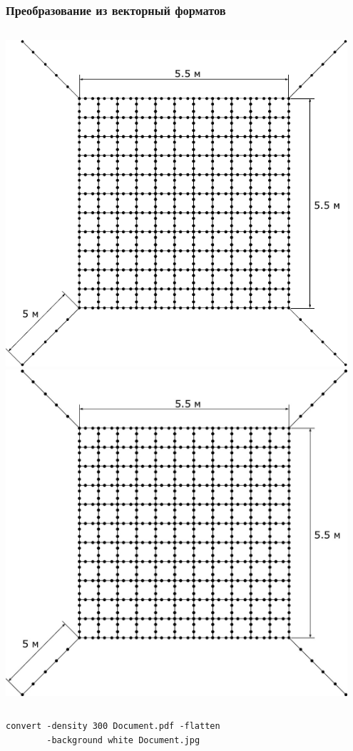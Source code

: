 \documentclass[11pt, compress]{beamer}
\begin{document}
\begin{frame}[c, fragile]
\frametitle{Преобразование из векторный форматов}
\begin{columns}
\includegraphics[width=0.95\textwidth]{net.pdf}
\includegraphics[width=0.95\textwidth]{net300.jpg}
\end{columns}  
\vfill
\begin{lstlisting}
convert -density 300 Document.pdf -flatten 
        -background white Document.jpg
\end{lstlisting}
\end{frame}
\end{document}
